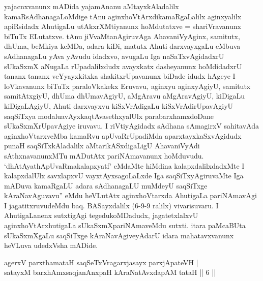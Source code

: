 


\begin{artha}
yajacnxvanunx mADida yajamAnanu aMtayxkAladalilx kamaRsAdhanagaLoMdige tAnu aginxhoVtArxdikamaRgaLalilx aginxyalilx apiRsidadx AhutigaLu utAkxrXMtiyanunx hoMdutatxve = shariVravanunx biTuTx ELutatxve. tAnu jiVvaMtanAgiruvAga AhavaniVyAginx, samitutx, dhUma, beMkiya keMDa, adara kiDi, matutx Ahuti darxvayxgaLu eMbuva sAdhanagaLu yAva yAvudu idadxvo, avugaLu Iga naSaTxvAgidadxrU sUkaSxmX aNugaLa rUpadalilxdudx avayxkatx dasheyanunx hoMdidadxrU tananx tananx veYyayxkitxka shakitxrUpavanunx biDade idudx hAgeye I loVkavanunx biTuTx paraloVkakekx Eruvavu, aginxyu aginxyAgiyU, samitutx samitAtxgiyU, dhUma dhUmavAgiyU, aMgAravu aMgAravAgiyU, kiDigaLu kiDigaLAgiyU, Ahuti darxvayxvu kiSxVrAdigaLu kiSxVrAdirUpavAgiyU saqSiTxya modalu\break avAyxkaqtAvasethxyalUlx parabarxhamxdoDane sUkaSxmXrUpavAgiye iruvavu. I riVtiyAgidadx sAdhana sAmagirxV sahitavAda aginxhoVtarxveMba kamaRvu apUvaRrUpadiMda aparxtayxkaSxvAgidudx punaH saqSiTxkAladalilx aMtarikASxdigaLigU AhavaniVyAdi sAthxnavanunxMTu mADutAtx pariNAmavanunx hoMduvudu. `dhAtAyathApUvaRmakalapxyatf' eMdaMte hiMdina kalapxdalilxdadxMte I kalapxdalUlx savxlapxvU vayxtAyxsagoLaLxde Iga saqSiTxyAgiruvaMte Iga mADuva kamaRgaLU adara sAdhanagaLU muMdeyU saqSiTxge kAraNavAguvavu'' eMdu heVLutAtx aginxhoVtarxda AhutigaLa pariNAmavAgi I jagatitxruvudeMdu baq. BASayxdalilx (6-9-9 ralilx) vivarisuvaru. I AhutigaLanenx sutxtigAgi tegedukoMDadudx, jagatetxlalxvU aginxhoVtArxhutigaLa sUkaSxmXpariNAmaveMdu sutxti. itara paMcaBUta sUkaSxmXgaLu saqSiTxge kAraNavAgiveyAdarU idara mahatavxvanunx heVLuva udedxVsha mADide.
\end{artha}

\begin{shl}
agerxV parxthamataH saqSeTxVragarxjasayx parxjApateVH | \\
satayxM barxhAmxsaqjanAnxpaH kAraNatAvxdapAM tataH \hfill ||  6 || 
\end{shl}

